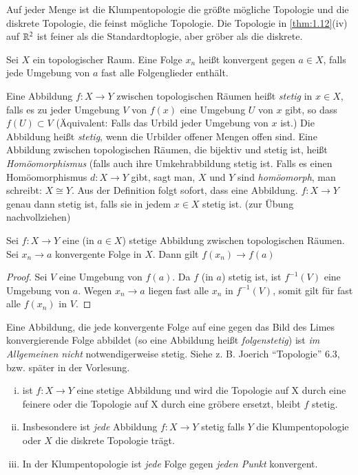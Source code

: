 \documentclass[a4paper,10pt]{scrartcl}
\newcommand{\homo}{\cong}
\begin{document}
Auf jeder Menge ist die Klumpentopologie die größte mögliche Topologie und die diskrete Topologie, die feinst mögliche Topologie.  Die Topologie in \ref{thm:1.12}(iv) auf $ \mathbb{R}^2 $ ist feiner als die Standardtoplogie, aber gröber als die diskrete.

\begin{df}
Sei $ X $ ein topologischer Raum.  Eine Folge $ x_n $ heißt konvergent gegen $ a\in X $, falls jede Umgebung von $ a $ fast alle Folgenglieder enthält.
\end{df}
\begin{df}\label{thm:1.15}
Eine Abbildung $ f:X\to Y $ zwischen topologischen Räumen heißt \emph{stetig} in $ x\in X $, falls es zu jeder Umgebung $ V $ von $ f(x) $ eine Umgebung $ U $ von $ x $ gibt, so dass $ f(U)\subset V $ (Äquivalent: Falls das Urbild jeder Umgebung von $ x $ ist.) Die Abbildung heißt \emph{stetig}, wenn die Urbilder offener Mengen offen sind. Eine Abbildung zwischen topologischen Räumen, die bijektiv und stetig ist, heißt \emph{Homöomorphismus} (falls auch ihre Umkehrabbildung stetig ist.  Falls es einen Homöomorphismus $ d: X\to Y $ gibt, sagt man, $ X $ und $ Y $ sind \emph{homöomorph}, man schreibt: $ X\homo Y $.
Aus der Definition folgt sofort, dass eine Abbildung. $ f: X\to Y $ genau dann stetig ist, falls sie in jedem $ x\in X $ stetig ist. (zur Übung nachvollziehen)
\end{df}
\begin{st}
Sei $ f: X\to Y $ eine (in $ a\in X $) stetige Abbildung zwischen topologischen Räumen.  Sei $ x_n\to a $ konvergente Folge in $ X $. Dann gilt $ f(x_n) \to f(a) $
\end{st}
\begin{proof}
Sei $ V $ eine Umgebung von $ f(a) $. Da $ f $ (in $ a $) stetig ist, ist $ f^{-1}(V) $ eine Umgebung von $a$.  Wegen $ x_n\to a $ liegen fast alle $ x_n $ in $f^{-1}(V)$, somit gilt für fast alle $f(x_n)$ in $ V $.
\end{proof}
\begin{att}
Eine Abbildung, die jede konvergente Folge auf eine gegen das Bild des Limes konvergierende Folge abbildet (so eine Abbildung heißt \emph{folgenstetig}) ist \emph{im Allgemeinen nicht} notwendigerweise stetig. Siehe z. B. Joerich "`Topologie"' 6.3, bzw. später in der Vorlesung.
\end{att}
\begin{ex*}
\begin{enumerate}[(i)]
\item ist $ f: X\to Y $ eine stetige Abbildung und wird die Topologie auf X durch eine feinere oder die Topologie auf X durch eine gröbere ersetzt, bleibt $ f $ stetig.
\item Insbesondere ist \emph{jede} Abbildung $ f: X\to Y $ stetig falls $ Y $ die Klumpentopologie oder $ X $ die diskrete Topologie trägt.
\item In der Klumpentopologie ist \emph{jede} Folge gegen \emph{jeden Punkt} konvergent. 
\end{enumerate}
\end{ex*}
\end{document}
